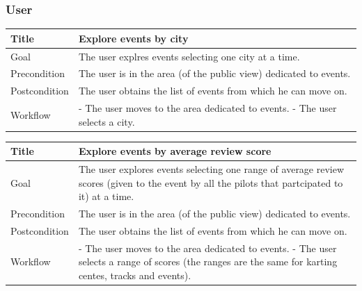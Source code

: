\documentclass{beamer}
\begin{document}
\begin{frame}
    \frametitle{User}
    \begin{table}
        \tiny
        \begin{tabular}{|p{2cm}|p{6cm}|}
        \hline
        Title & \textbf{Explore events by city} \\
        \hline
        Goal & The user explres events selecting one city at a time. \\
        \hline
        Precondition & The user is in the area (of the public view) dedicated to events.\\
        \hline
        Postcondition & The user obtains the list of events from which he can move on.\\
        \hline
        Workflow &
        - The user moves to the area dedicated to events. \newline
        - The user selects a city. \\
        \hline
        \end{tabular}
\end{table}

\begin{table}
    \tiny
    \begin{tabular}{|p{2cm}|p{6cm}|}
    \hline
    Title & \textbf{Explore events by average review score} \\
    \hline
    Goal & The user explores events selecting one range of average review scores (given to the event by all the pilots
    that partcipated to it) at a time. \\
    \hline
    Precondition & The user is in the area (of the public view) dedicated to events.\\
    \hline
    Postcondition & The user obtains the list of events from which he can move on.\\
    \hline
    Workflow &
    - The user moves to the area dedicated to events. \newline
    - The user selects a range of scores (the ranges are the same for karting centes, tracks and events). \\
    \hline
    \end{tabular}
\end{table}
\end{frame}



\end{document}
